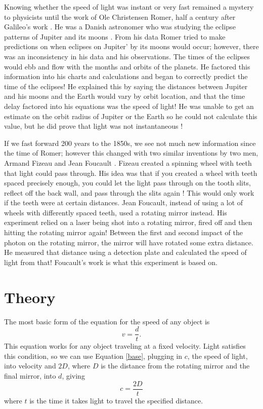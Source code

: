 \documentclass[aps,prl,10pt,twocolumn,floatfix]{revtex4-2}
\begin{document}
Knowing whether the speed of light was instant or very fast remained a mystery to physicists until the work of Ole Christensen Romer,  half a century after Galileo's work \cite{light}. 
He was a Danish astronomer who was studying the eclipse patterns of Jupiter and its moons \cite{light}.
From his data Romer tried to make predictions on when eclipses on Jupiter' by its moons would occur;
however, there was an inconsistency in his data and his observations. 
The times of the eclipses would ebb and flow with the months and orbits of the planets.
He factored this information into his charts and calculations and began to correctly predict the time of the eclipses!
He explained this by saying the distances between Jupiter and his moons and the Earth would vary by orbit location, and that the time delay factored into his equations was the speed of light!
He was unable to get an estimate on the orbit radius of Jupiter or the Earth so he could not calculate this value, but he did prove that light was not instantaneous \cite{light}!

If we fast forward 200 years to the 1850s, we see not much new information since the time of Romer;
however this changed with two similar inventions by two men, Armand Fizeau and Jean Foucault \cite{light}. 
Fizeau created a spinning wheel with teeth that light could pass through. 
His idea was that if you created a wheel with teeth spaced precisely enough, you could let the light pass through on the tooth slits, reflect off the back wall, and pass through the slits again \cite{light}!
This would only work if the teeth were at certain distances.
Jean Foucault, instead of using a lot of wheels with differently spaced teeth, used a rotating mirror instead.
His experiment relied on a laser being shot into a rotating mirror, fired off and then hitting the rotating mirror again!
Between the first and second impact of the photon on the rotating mirror, the mirror will have rotated some extra distance.
He measured that distance using a detection plate and calculated the speed of light from that!
Foucault's work is what this experiment is based on.

\section{Theory}\label{Theory}
The most basic form of the equation for the speed of any object is 
\begin{equation}\label{base}
v=\frac{d}{t	}.
\end{equation}
This equation works for any object traveling at a fixed velocity. 
Light satisfies this condition, so we can use Equation \ref{base}, plugging in $c$, the speed of light, into velocity and $2D$, where $D$ is the distance from the rotating mirror and the final mirror, into $d$, giving
\begin{equation}\label{plug}
c=\frac{2D}{t}
\end{equation}
where $t$ is the time it takes light to travel the specified distance. 
\end{document}
